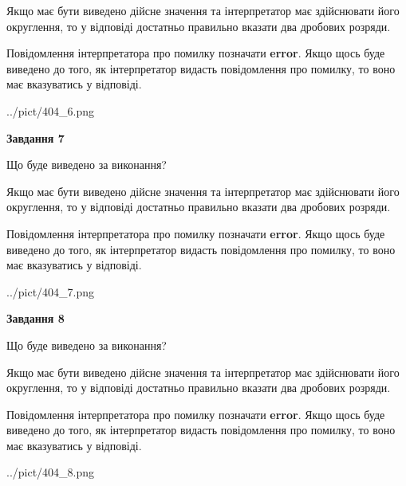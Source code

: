 \documentclass[12pt, ukrainian]{article}
\begin{document}
{\begin {Large}
Якщо має бути виведено дійсне значення та інтерпретатор має здійснювати його округлення, 
то у відповіді достатньо правильно вказати два дробових розряди.

Повідомлення інтерпретатора про помилку позначати \textbf{error}.
Якщо щось буде виведено до того, як інтерпретатор видасть повідомлення про помилку, 
то воно має вказуватись у відповіді. \par

\begin{center}
	{../pict/404_6.png}
\end{center}
\newpage

{\begin {center}\textbf{Завдання 7}\end {center}}\par
Що буде виведено за виконання? \par

Якщо має бути виведено дійсне значення та інтерпретатор має здійснювати його округлення, 
то у відповіді достатньо правильно вказати два дробових розряди.

Повідомлення інтерпретатора про помилку позначати \textbf{error}.
Якщо щось буде виведено до того, як інтерпретатор видасть повідомлення про помилку, 
то воно має вказуватись у відповіді. \par

\begin{center}
	{../pict/404_7.png}
\end{center}
\newpage

{\begin {center}\textbf{Завдання 8}\end {center}}\par
Що буде виведено за виконання? \par

Якщо має бути виведено дійсне значення та інтерпретатор має здійснювати його округлення, 
то у відповіді достатньо правильно вказати два дробових розряди.

Повідомлення інтерпретатора про помилку позначати \textbf{error}.
Якщо щось буде виведено до того, як інтерпретатор видасть повідомлення про помилку, 
то воно має вказуватись у відповіді. \par

\begin{center}
	{../pict/404_8.png}
\end{center}
\newpage


\end{Large}}
\end{document}
